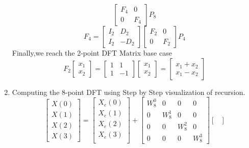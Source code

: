 \documentclass[journal,12pt,twocolumn]{IEEEtran}
\renewcommand\thesection{\arabic{section}}
\begin{document}
\begin{enumerate}[label=\thesection.\arabic*.,ref=\thesection.\theenumi]
\begin{equation}
\begin{bmatrix}
F_{4} & 0 \\
0 & F_{4}
\end{bmatrix}
P_{8}
\end{equation}
\begin{equation}
F_{4}=
\begin{bmatrix}
I_{2} & D_{2} \\
I_{2} & -D_{2}
\end{bmatrix}
\begin{bmatrix}
F_{2} & 0 \\
0 & F_{2}
\end{bmatrix}
P_{4}
\end{equation}
Finally,we reach  the 2-point DFT Matrix base case 
\begin{equation}
F_{2}
\begin{bmatrix}
x_{1} \\
x_{2}
\end{bmatrix}
=
\begin{bmatrix}
1 & 1 \\
1 & -1
\end{bmatrix}
\begin{bmatrix}
x_{1} \\
x_{2}
\end{bmatrix}
=
\begin{bmatrix}
x_{1}+x_{2} \\
x_{1}-x_{2}
\end{bmatrix}
\end{equation}
\item Computing the 8-point DFT using Step by Step visualization of recursion.
\begin{equation}
\begin{bmatrix}
X(0) \\ 
X(1) \\ 
X(2) \\ 
X(3)
\end{bmatrix}
=
\begin{bmatrix}
X_{e}(0) \\ 
X_{e}(1)\\ 
X_{e}(2)\\
X_{e}(3)\\
\end{bmatrix}
+
\begin{bmatrix}
W^{0}_{8} & 0 & 0 & 0\\
0 & W^{1}_{8} & 0 & 0\\
0 & 0 & W^{2}_{8} & 0\\
0 & 0 & 0 & W^{3}_{8}
\end{bmatrix}
\begin{bmatrix}

\end{bmatrix}
\end{equation}
\end{enumerate}
\end{document}
